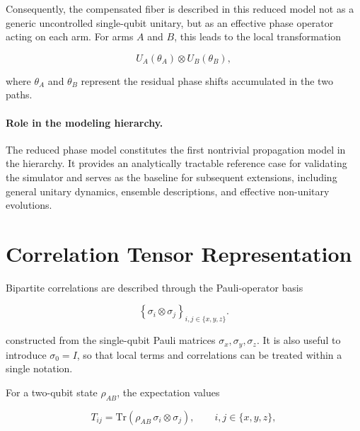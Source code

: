 \medskip

Consequently, the compensated fiber is described in this reduced model not as a generic uncontrolled single-qubit unitary, but as an effective phase operator acting on each arm. For arms \( A \) and \( B \), this leads to the local transformation

\[
U_A(\theta_A)\otimes U_B(\theta_B),
\]

where \( \theta_A \) and \( \theta_B \) represent the residual phase shifts accumulated in the two paths.

\medskip

\paragraph{Role in the modeling hierarchy.}

The reduced phase model constitutes the first nontrivial propagation model in the hierarchy. It provides an analytically tractable reference case for validating the simulator and serves as the baseline for subsequent extensions, including general unitary dynamics, ensemble descriptions, and effective non-unitary evolutions.


\section{Correlation Tensor Representation}
\label{sec:correlation_tensor_representation}

Bipartite correlations are described through the Pauli-operator basis

\[
\left\{
\sigma_i \otimes \sigma_j
\right\}_{i,j \in \{x,y,z\}}.
\]

constructed from the single-qubit Pauli matrices \( \sigma_x, \sigma_y, \sigma_z \). It is also useful to introduce \( \sigma_0 = I \), so that local terms and correlations can be treated within a single notation.

\medskip

For a two-qubit state \( \rho_{AB} \), the expectation values

\begin{equation}
T_{ij}
=
\mathrm{Tr}
\left(
\rho_{AB}\,
\sigma_i \otimes \sigma_j
\right),
\qquad
i,j \in \{x,y,z\},
\label{eq:correlation_tensor_components}
\end{equation}


